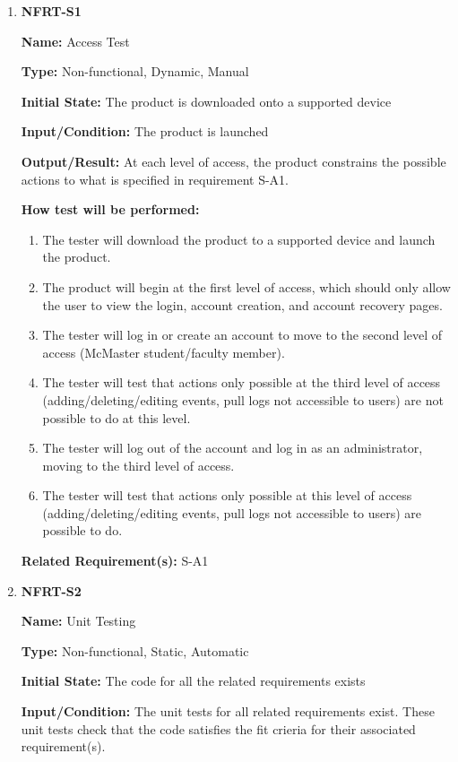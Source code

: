 \documentclass[12pt, titlepage]{article}
\begin{document}
\begin{enumerate}
\item{\textbf{NFRT-S1}}

\textbf{Name:} Access Test
  
\textbf{Type:} Non-functional, Dynamic, Manual
            
\textbf{Initial State:} The product is downloaded onto a supported device
  
\textbf{Input/Condition:} The product is launched
            
\textbf{Output/Result:} At each level of access, the product constrains the possible actions to what is specified in requirement S-A1.
  
\textbf{How test will be performed:}
\begin{enumerate}
  \item The tester will download the product to a supported device and launch the product.
  \item The product will begin at the first level of access, which should only allow the user to view the login, account creation, and account recovery pages.
  \item The tester will log in or create an account to move to the second level of access (McMaster student/faculty member).
  \item The tester will test that actions only possible at the third level of access (adding/deleting/editing events, pull logs not accessible to users) are not possible to do at this level.
  \item The tester will log out of the account and log in as an administrator, moving to the third level of access.
  \item The tester will test that actions only possible at this level of access (adding/deleting/editing events, pull logs not accessible to users) are possible to do.
\end{enumerate}

\textbf{Related Requirement(s):} S-A1

\item{\textbf{NFRT-S2}}

\textbf{Name:} Unit Testing

\textbf{Type:} Non-functional, Static, Automatic
					
\textbf{Initial State:} The code for all the related requirements exists

\textbf{Input/Condition:} The unit tests for all related requirements exist. These unit tests check that the code satisfies the fit crieria for their associated requirement(s).


\end{enumerate}
\end{document}
